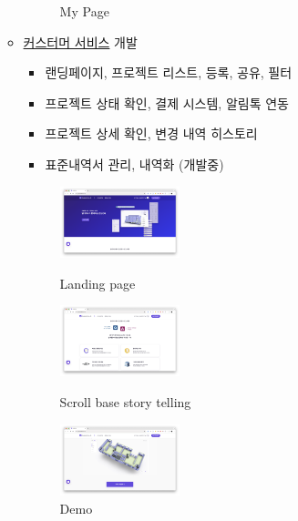 \begin{itemize}
\begin{itemize}[label=$\star$]
\begin{figure}[!ht]
\begin{fullwidth}
{					            \caption*{My Page}
				            }
			            \end{fullwidth}
		            \end{figure}
		      \item \href{https://app.builderhub.io}{커스터머 서비스} 개발
		            \begin{itemize}
			            \item 랜딩페이지, 프로젝트 리스트, 등록, 공유, 필터
			            \item 프로젝트 상태 확인, 결제 시스템, 알림톡 연동
			            \item 프로젝트 상세 확인, 변경 내역 히스토리
			            \item 표준내역서 관리, 내역화 (개발중)
		            \end{itemize}
		            \begin{figure}[!ht]
			            \begin{fullwidth}
				            \parbox{0.35\textwidth}{
					            \centering
					            \includegraphics[width=0.35\textwidth]{images/builderhub-customer-1.png}
					            \caption*{Landing page}
				            }\qquad
				            \parbox{0.35\textwidth}{
					            \centering
					            \includegraphics[width=0.35\textwidth]{images/builderhub-customer-2.png}
					            \caption*{Scroll base story telling}
				            }\qquad
				            \parbox{0.35\textwidth}{
					            \centering
					            \includegraphics[width=0.35\textwidth]{images/builderhub-customer-3.png}
					            \caption*{Demo}
				            }\qquad

\end{fullwidth}
\end{figure}
\end{itemize}
\end{itemize}
